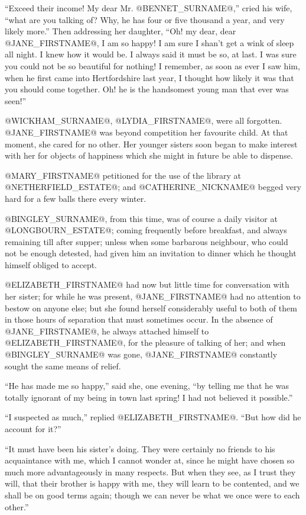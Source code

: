 ``Exceed their income! My dear Mr. @BENNET_SURNAME@,'' cried his wife, ``what are you
talking of? Why, he has four or five thousand a year, and very likely
more.'' Then addressing her daughter, ``Oh! my dear, dear @JANE_FIRSTNAME@, I am so
happy! I am sure I shan't get a wink of sleep all night. I knew how it
would be. I always said it must be so, at last. I was sure you could not
be so beautiful for nothing! I remember, as soon as ever I saw him, when
he first came into Hertfordshire last year, I thought how likely it was
that you should come together. Oh! he is the handsomest young man that
ever was seen!''

@WICKHAM_SURNAME@, @LYDIA_FIRSTNAME@, were all forgotten. @JANE_FIRSTNAME@ was beyond competition her
favourite child. At that moment, she cared for no other. Her younger
sisters soon began to make interest with her for objects of happiness
which she might in future be able to dispense.

@MARY_FIRSTNAME@ petitioned for the use of the library at @NETHERFIELD_ESTATE@; and @CATHERINE_NICKNAME@
begged very hard for a few balls there every winter.

@BINGLEY_SURNAME@, from this time, was of course a daily visitor at @LONGBOURN_ESTATE@;
coming frequently before breakfast, and always remaining till after
supper; unless when some barbarous neighbour, who could not be enough
detested, had given him an invitation to dinner which he thought himself
obliged to accept.

@ELIZABETH_FIRSTNAME@ had now but little time for conversation with her sister; for
while he was present, @JANE_FIRSTNAME@ had no attention to bestow on anyone else;
but she found herself considerably useful to both of them in those hours
of separation that must sometimes occur. In the absence of @JANE_FIRSTNAME@, he
always attached himself to @ELIZABETH_FIRSTNAME@, for the pleasure of talking of
her; and when @BINGLEY_SURNAME@ was gone, @JANE_FIRSTNAME@ constantly sought the same means of
relief.

``He has made me so happy,'' said she, one evening, ``by telling me that he
was totally ignorant of my being in town last spring! I had not believed
it possible.''

``I suspected as much,'' replied @ELIZABETH_FIRSTNAME@. ``But how did he account for
it?''

``It must have been his sister's doing. They were certainly no friends to
his acquaintance with me, which I cannot wonder at, since he might have
chosen so much more advantageously in many respects. But when they see,
as I trust they will, that their brother is happy with me, they will
learn to be contented, and we shall be on good terms again; though we
can never be what we once were to each other.''

